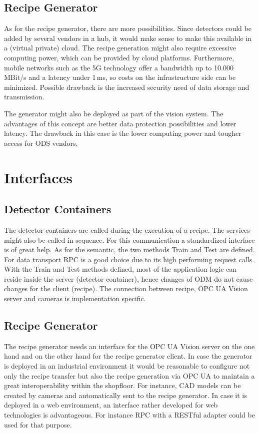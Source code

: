 \subsection{Recipe Generator}
As for the recipe generator, there are more possibilities. Since detectors could be added by several vendors in a hub, it would make sense to make this available in a (virtual private) cloud. The recipe generation might also require excessive computing power, which can be provided by cloud platforms. Furthermore, mobile networks such as the 5G technology offer a bandwidth up to 10.000\,MBit/s and a latency under 1\,ms, so costs on the infrastructure side can be minimized. Possible drawback is the increased security need of data storage and transmission.

The generator might also be deployed as part of the vision system. The advantages of this concept are better data protection possibilities and lower latency. The drawback in this case is the lower computing power and tougher access for ODS vendors.

\section{Interfaces}
\subsection{Detector Containers}
The detector containers are called during the execution of a recipe. The services might also be called in sequence. For this communication a standardized interface is of great help. As for the semantic, the two methods Train and Test are defined. For data transport RPC is a good choice due to its high performing request calls. With the Train and Test methods defined, most of the application logic can reside inside the server (detector container), hence changes of ODM do not cause changes for the client (recipe). The connection between recipe, OPC UA Vision server and cameras is implementation specific.

\subsection{Recipe Generator}
The recipe generator needs an interface for the OPC UA Vision server on the one hand and on the other hand for the recipe generator client. In case the generator is deployed in an industrial environment it would be reasonable to configure not only the recipe transfer but also the recipe generation via OPC UA to maintain a great interoperability within the shopfloor. For instance, CAD models can be created by cameras and automatically sent to the recipe generator. In case it is deployed in a web environment, an interface rather developed for web technologies is advantageous. For instance RPC with a RESTful adapter could be used for that purpose.

